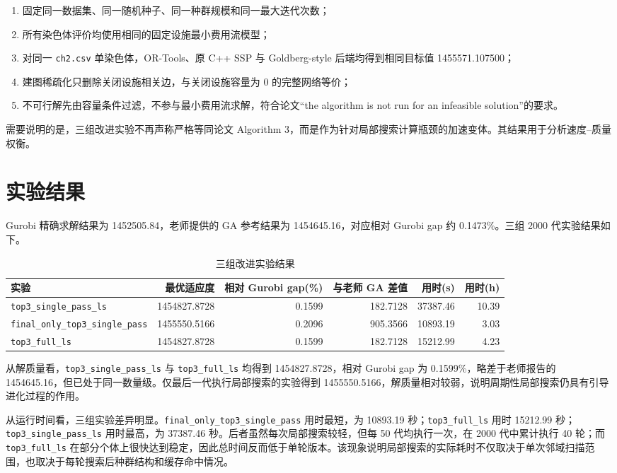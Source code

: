 \documentclass{article}
\begin{document}
\begin{enumerate}
    \item 固定同一数据集、同一随机种子、同一种群规模和同一最大迭代次数；
    \item 所有染色体评价均使用相同的固定设施最小费用流模型；
    \item 对同一 \texttt{ch2.csv} 单染色体，OR-Tools、原 C++ SSP 与 Goldberg-style 后端均得到相同目标值 1455571.107500；
    \item 建图稀疏化只删除关闭设施相关边，与关闭设施容量为 0 的完整网络等价；
    \item 不可行解先由容量条件过滤，不参与最小费用流求解，符合论文“the algorithm is not run for an infeasible solution”的要求。
\end{enumerate}

需要说明的是，三组改进实验不再声称严格等同论文 Algorithm 3，而是作为针对局部搜索计算瓶颈的加速变体。其结果用于分析速度--质量权衡。

\section{实验结果}

Gurobi 精确求解结果为 1452505.84，老师提供的 GA 参考结果为 1454645.16，对应相对 Gurobi gap 约 0.1473\%。三组 2000 代实验结果如下。

\begin{table}[H]
\centering
\caption{三组改进实验结果}
\begin{tabular}{lrrrrr}
\toprule
实验 & 最优适应度 & 相对 Gurobi gap(\%) & 与老师 GA 差值 & 用时(s) & 用时(h) \\
\midrule
\texttt{top3\_single\_pass\_ls} & 1454827.8728 & 0.1599 & 182.7128 & 37387.46 & 10.39 \\
\texttt{final\_only\_top3\_single\_pass} & 1455550.5166 & 0.2096 & 905.3566 & 10893.19 & 3.03 \\
\texttt{top3\_full\_ls} & 1454827.8728 & 0.1599 & 182.7128 & 15212.99 & 4.23 \\
\bottomrule
\end{tabular}
\end{table}

从解质量看，\texttt{top3\_single\_pass\_ls} 与 \texttt{top3\_full\_ls} 均得到 1454827.8728，相对 Gurobi gap 为 0.1599\%，略差于老师报告的 1454645.16，但已处于同一数量级。仅最后一代执行局部搜索的实验得到 1455550.5166，解质量相对较弱，说明周期性局部搜索仍具有引导进化过程的作用。

从运行时间看，三组实验差异明显。\texttt{final\_only\_top3\_single\_pass} 用时最短，为 10893.19 秒；\texttt{top3\_full\_ls} 用时 15212.99 秒；\texttt{top3\_single\_pass\_ls} 用时最高，为 37387.46 秒。后者虽然每次局部搜索较轻，但每 50 代均执行一次，在 2000 代中累计执行 40 轮；而 \texttt{top3\_full\_ls} 在部分个体上很快达到稳定，因此总时间反而低于单轮版本。该现象说明局部搜索的实际耗时不仅取决于单次邻域扫描范围，也取决于每轮搜索后种群结构和缓存命中情况。
\end{document}
